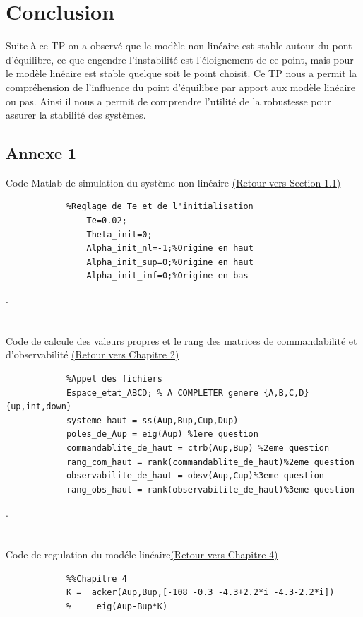 \documentclass[12pt, a4paper, openany]{report}
\begin{document}
      
\chapter*{Conclusion}
      Suite à ce TP on a observé que le modèle non linéaire est stable autour du pont d'équilibre, ce que engendre l'instabilité est l'éloignement de ce point, mais pour le modèle linéaire est stable quelque soit le point choisit.
      Ce TP nous a permit la compréhension de l’influence du point d’équilibre par apport aux modèle linéaire ou pas.
      Ainsi il nous a permit de comprendre l'utilité de la robustesse pour assurer la stabilité des systèmes.   








\begin{appendices}
\chapter*{Annexe 1}
		Code Matlab de simulation du système non linéaire \hyperref[annexe1]{(Retour vers Section 1.1)}\label{section1.1}
		
		\begin{lstlisting}
			%Reglage de Te et de l'initialisation
    			Te=0.02;
    			Theta_init=0;
    			Alpha_init_nl=-1;%Origine en haut
    			Alpha_init_sup=0;%Origine en haut
    			Alpha_init_inf=0;%Origine en bas    			
		\end{lstlisting}
		.\\\\\\
		Code de calcule des valeurs propres et le rang des matrices de commandabilité et d'observabilité \hyperref[annexe11]{(Retour vers Chapitre 2)}\label{section1.11}
		\begin{lstlisting}
			%Appel des fichiers
			Espace_etat_ABCD; % A COMPLETER genere {A,B,C,D}{up,int,down}
			systeme_haut = ss(Aup,Bup,Cup,Dup)
			poles_de_Aup = eig(Aup) %1ere question
			commandablite_de_haut = ctrb(Aup,Bup) %2eme question
			rang_com_haut = rank(commandablite_de_haut)%2eme question
			observabilite_de_haut = obsv(Aup,Cup)%3eme question
			rang_obs_haut = rank(observabilite_de_haut)%3eme question		    			
		\end{lstlisting}
		.\\\\\\
		Code de regulation du modéle linéaire\hyperref[annexe111]{(Retour vers Chapitre 4)}\label{section1.111}
		\begin{lstlisting}
			%%Chapitre 4
			K =  acker(Aup,Bup,[-108 -0.3 -4.3+2.2*i -4.3-2.2*i])
			%     eig(Aup-Bup*K)	   			
		\end{lstlisting}
				
\end{appendices}





%
%
\end{document}
